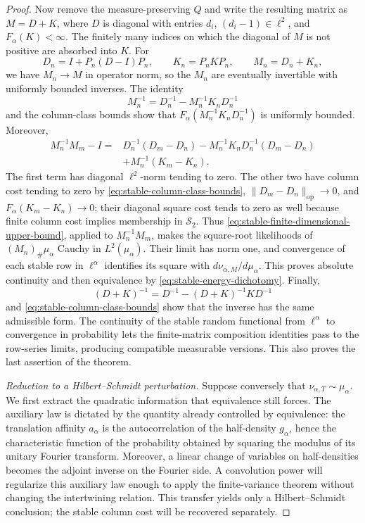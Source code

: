 \begin{proof}
Now remove the measure-preserving \(Q\) and write the resulting matrix as
\(M=D+K\), where \(D\) is diagonal with entries \(d_i\),
\((d_i-1)\in\ell^2\), and
\(F_\alpha(K)<\infty\).
The finitely many indices on which the diagonal of \(M\) is not positive
are absorbed into \(K\).
For
\[
 D_n=I+P_n(D-I)P_n,
 \qquad K_n=P_nKP_n,
 \qquad M_n=D_n+K_n,
\]
we have \(M_n\to M\) in operator norm, so the \(M_n\) are eventually
invertible with uniformly bounded inverses.
The identity
\[
 M_n^{-1}=D_n^{-1}-M_n^{-1}K_nD_n^{-1}
\]
and the column-class bounds show that
\(F_\alpha(M_n^{-1}K_nD_n^{-1})\) is uniformly bounded.  Moreover,
\begin{equation}
 \begin{aligned}
 M_n^{-1}M_m-I
 ={}&D_n^{-1}(D_m-D_n)-M_n^{-1}K_nD_n^{-1}(D_m-D_n)\\
    &+M_n^{-1}(K_m-K_n).
 \end{aligned}
 \label{eq:stable-relative-approximants}
\end{equation}
The first term has diagonal \(\ell^2\)-norm tending to zero.
The other two have column cost tending to zero by
\eqref{eq:stable-column-class-bounds},
\(\|D_m-D_n\|_{\mathrm{op}}\to0\), and
\(F_\alpha(K_m-K_n)\to0\); their diagonal square cost tends to zero as
well because finite column cost implies membership in \(\mathcal S_2\).
Thus \eqref{eq:stable-finite-dimensional-upper-bound}, applied to
\(M_n^{-1}M_m\), makes the square-root likelihoods of
\((M_n)_\#\mu_\alpha\) Cauchy in \(L^2(\mu_\alpha)\).
Their limit has norm one, and convergence of each stable row in
\(\ell^\alpha\) identifies its square with
\(d\nu_{\alpha,M}/d\mu_\alpha\).
This proves absolute continuity and then equivalence by
\eqref{eq:stable-energy-dichotomy}.
Finally,
\begin{equation}
 (D+K)^{-1}
 =D^{-1}-(D+K)^{-1}KD^{-1}
 \label{eq:stable-inverse-decomposition}
\end{equation}
and \eqref{eq:stable-column-class-bounds} show that the inverse has the same
admissible form.
The continuity of the stable random functional from \(\ell^\alpha\) to
convergence in probability lets the finite-matrix composition identities
pass to the row-series limits, producing compatible measurable versions.
This also proves the last assertion of the theorem.

\emph{Reduction to a Hilbert--Schmidt perturbation.}
Suppose conversely that \(\nu_{\alpha,T}\sim\mu_\alpha\).  We first extract
the quadratic information that equivalence still forces.  The auxiliary law
is dictated by the quantity already controlled by equivalence: the translation
affinity \(a_\alpha\) is the autocorrelation of the half-density \(g_\alpha\),
hence the characteristic function of the probability obtained by squaring the
modulus of its unitary Fourier transform.  Moreover, a linear change of
variables on half-densities becomes the adjoint inverse on the Fourier side.  A
convolution power will regularize this auxiliary law enough to apply the
finite-variance theorem without changing the intertwining relation.  This
transfer yields only a Hilbert--Schmidt conclusion; the stable column cost will
be recovered separately.


\end{proof}
